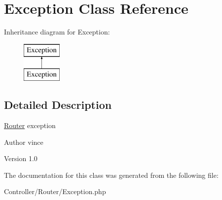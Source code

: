 \hypertarget{class_anemo_1_1_controller_1_1_router_1_1_exception}{
\section{Exception Class Reference}
\label{class_anemo_1_1_controller_1_1_router_1_1_exception}
}
Inheritance diagram for Exception:\begin{figure}[H]
\begin{center}
\leavevmode
\includegraphics[height=2.000000cm]{class_anemo_1_1_controller_1_1_router_1_1_exception}
\end{center}
\end{figure}


\subsection{Detailed Description}
\hyperlink{namespace_anemo_1_1_controller_1_1_router}{Router} exception \begin{DoxyAuthor}{Author}
vince 
\end{DoxyAuthor}
\begin{DoxyVersion}{Version}
1.0 
\end{DoxyVersion}


The documentation for this class was generated from the following file:\begin{DoxyCompactItemize}
\item 
Controller/Router/Exception.php\end{DoxyCompactItemize}
